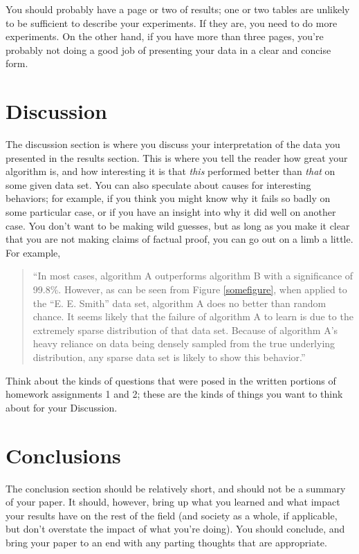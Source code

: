 \documentclass[12pt, letterpaper]{article}
\begin{document}
You should probably have a page or two of results; one or two tables are unlikely to be
sufficient to describe your experiments.  If they are, you need to do more
experiments.  On the other hand, if you have more than three pages, you're
probably not doing a good job of presenting your data in a clear and concise
form.

\section{Discussion}
The discussion section is where you discuss your interpretation of the data you
presented in the results section.  This is where you tell the reader how great
your algorithm is, and how interesting it is that \emph{this} performed better
than \emph{that} on some given data set.  You can also speculate about causes
for interesting behaviors; for example, if you think you might know why it fails
so badly on some particular case, or if you have an insight into why it did well
on another case.  You don't want to be making wild guesses, but as long as you
make it clear that you are not making claims of factual proof, you can go out on
a limb a little.  For example,

\begin{quote}
``In most cases, algorithm A outperforms algorithm B with a significance of
99.8\%.  However, as can be seen from Figure \ref{somefigure}, when applied to
the ``E. E. Smith'' data set, algorithm A does no better than random chance.  It
seems likely that the failure of algorithm A to learn is due to the extremely
sparse distribution of that data set.  Because of algorithm A's heavy reliance
on data being densely sampled from the true underlying distribution, any sparse
data set is likely to show this behavior.''
\end{quote}

Think about the kinds of questions that were posed in the written portions of
homework assignments 1 and 2; these are the kinds of things you want to think
about for your Discussion.

\section{Conclusions}
The conclusion section should be relatively short, and should not be a summary
of your paper.  It should, however, bring up what you learned and what impact
your results have on the rest of the field (and society as a whole, if
applicable, but don't overstate the impact of what you're doing).  You should
conclude, and bring your paper to an end with any parting thoughts that are
appropriate.
\end{document}
